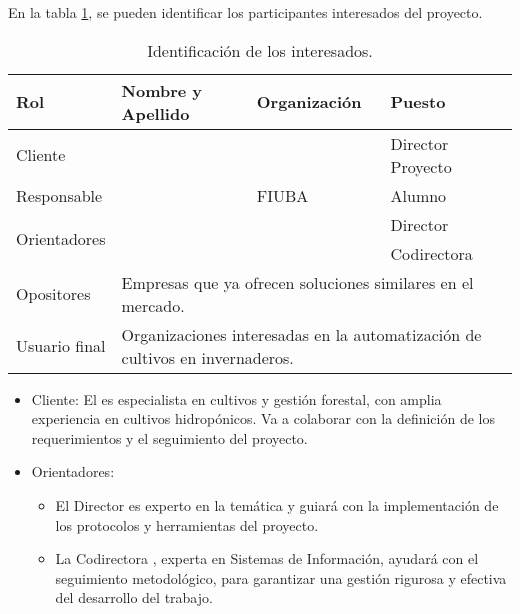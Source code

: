 En la tabla \ref{tab:interesados}, se pueden identificar los participantes interesados del proyecto.


\begin{table}[ht]
	\begin{tabularx}{\linewidth}{|p{2.15cm}|p{5.8cm}|p{2.85cm}|p{3.4cm}|}
		\hline
		\rowcolor[HTML]{C0C0C0}
		Rol                           & Nombre y Apellido                                                                              & Organización    & Puesto            \\ \hline
		Cliente                       & \clientename                                                                                   & \empclientename & Director Proyecto \\ \hline
		Responsable                   & \authorname                                                                                    & FIUBA           & Alumno            \\ \hline
		\multirow{2}{*}{Orientadores} & \supname                                                                                       & \pertesupname   & Director          \\
		                              & \cosupname                                                                                     & \pertecosupname & Codirectora       \\ \hline
		Opositores                    & \multicolumn{3}{l|}{Empresas que ya ofrecen soluciones similares en el mercado.}                                                     \\ \hline
		Usuario final                 & \multicolumn{3}{l|}{Organizaciones interesadas en la automatización de cultivos en invernaderos.}                                       \\ \hline
	\end{tabularx}
	\caption{Identificación de los interesados.}
	\label{tab:interesados}
\end{table}

\begin{itemize}
	\item Cliente: El \clientename\hspace{1px} es especialista en cultivos y gestión forestal, con amplia experiencia en
	      cultivos hidropónicos. Va a colaborar con la definición de los requerimientos y el seguimiento del proyecto.
	\item Orientadores:
	      \begin{itemize}
		      \item El Director \supname\hspace{1px} es experto en la temática y guiará con la
		            implementación de los protocolos y herramientas del proyecto.
		      \item La Codirectora \cosupname , experta en Sistemas de Información, ayudará con el
		            seguimiento metodológico, para garantizar una gestión rigurosa y efectiva del
		            desarrollo del trabajo.
	      \end{itemize}
\end{itemize}

